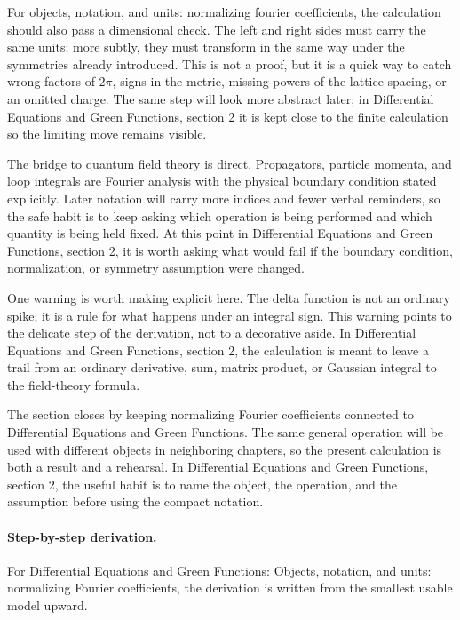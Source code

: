 For objects, notation, and units: normalizing fourier coefficients, the calculation should also pass a dimensional check.  The left and right sides must carry the same units; more subtly, they must transform in the same way under the symmetries already introduced.  This is not a proof, but it is a quick way to catch wrong factors of \(2\pi\), signs in the metric, missing powers of the lattice spacing, or an omitted charge.  The same step will look more abstract later; in Differential Equations and Green Functions, section 2 it is kept close to the finite calculation so the limiting move remains visible.

The bridge to quantum field theory is direct.  Propagators, particle momenta, and loop integrals are Fourier analysis with the physical boundary condition stated explicitly.  Later notation will carry more indices and fewer verbal reminders, so the safe habit is to keep asking which operation is being performed and which quantity is being held fixed.  At this point in Differential Equations and Green Functions, section 2, it is worth asking what would fail if the boundary condition, normalization, or symmetry assumption were changed.

One warning is worth making explicit here.  The delta function is not an ordinary spike; it is a rule for what happens under an integral sign.  This warning points to the delicate step of the derivation, not to a decorative aside.  In Differential Equations and Green Functions, section 2, the calculation is meant to leave a trail from an ordinary derivative, sum, matrix product, or Gaussian integral to the field-theory formula.

The section closes by keeping normalizing Fourier coefficients connected to Differential Equations and Green Functions.  The same general operation will be used with different objects in neighboring chapters, so the present calculation is both a result and a rehearsal.  In Differential Equations and Green Functions, section 2, the useful habit is to name the object, the operation, and the assumption before using the compact notation.



\paragraph{Step-by-step derivation.}

For Differential Equations and Green Functions: Objects, notation, and units: normalizing Fourier coefficients, the derivation is written from the smallest usable model upward.

